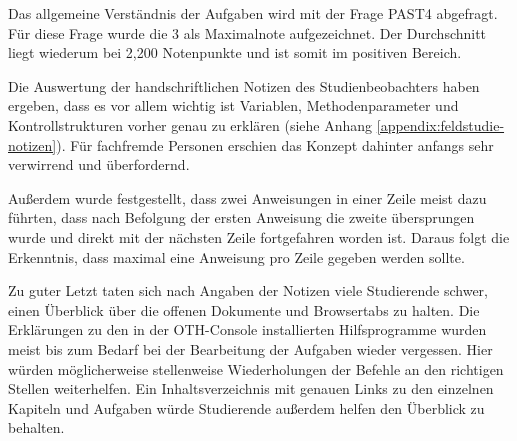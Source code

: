 Das allgemeine Verständnis der Aufgaben wird mit der Frage PAST4 abgefragt. Für
diese Frage wurde die 3 als Maximalnote aufgezeichnet. Der Durchschnitt liegt
wiederum bei 2,200 Notenpunkte und ist somit im positiven Bereich.

Die Auswertung der handschriftlichen Notizen des Studienbeobachters haben
ergeben, dass es vor allem wichtig ist Variablen, Methodenparameter und
Kontrollstrukturen vorher genau zu erklären (siehe Anhang
\ref{appendix:feldstudie-notizen}). Für fachfremde Personen erschien das Konzept
dahinter anfangs sehr verwirrend und überfordernd.

Außerdem wurde festgestellt, dass zwei Anweisungen in einer Zeile meist dazu
führten, dass nach Befolgung der ersten Anweisung die zweite übersprungen wurde
und direkt mit der nächsten Zeile fortgefahren worden ist. Daraus folgt die
Erkenntnis, dass maximal eine Anweisung pro Zeile gegeben werden sollte.

Zu guter Letzt taten sich nach Angaben der Notizen viele Studierende schwer,
einen Überblick über die offenen Dokumente und Browsertabs zu halten. Die
Erklärungen zu den in der OTH-Console installierten Hilfsprogramme wurden meist
bis zum Bedarf bei der Bearbeitung der Aufgaben wieder vergessen. Hier würden
möglicherweise stellenweise Wiederholungen der Befehle an den richtigen Stellen
weiterhelfen. Ein Inhaltsverzeichnis mit genauen Links zu den einzelnen Kapiteln
und Aufgaben würde Studierende außerdem helfen den Überblick zu behalten.
